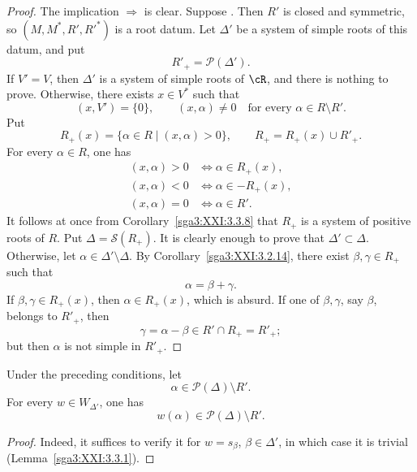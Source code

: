 \begin{proof}
The implication  \(\Rightarrow\)  is clear. Suppose .
Then \(R'\) is closed and symmetric, so
\((M,M^\ast,R',R'^\ast)\) is a root datum. Let \(\Delta'\) be a
system of simple roots of this datum, and put
\[
 R'_+=\mathscr{P}(\Delta').
\]
If \(V'=V\), then \(\Delta'\) is a system of simple roots of
\(\cR\), and there is nothing to prove. Otherwise, there exists
\(x\in V^\ast\) such that
\[
 (x,V')=\{0\},
 \qquad
 (x,\alpha)\ne0
 \quad\text{for every }\alpha\in R\setminus R'.
\]
Put
\[
 R_+(x)=\{\alpha\in R\mid(x,\alpha)>0\},
 \qquad
 R_+=R_+(x)\cup R'_+.
\]
For every \(\alpha\in R\), one has
\[
\begin{aligned}
 (x,\alpha)>0 &\Longleftrightarrow \alpha\in R_+(x),\\
 (x,\alpha)<0 &\Longleftrightarrow \alpha\in-R_+(x),\\
 (x,\alpha)=0 &\Longleftrightarrow \alpha\in R'.
\end{aligned}
\]
It follows at once from Corollary~\ref{sga3:XXI:3.3.8} that \(R_+\)
is a system of positive roots of \(R\). Put
\(\Delta=\mathscr{S}(R_+)\). It is clearly enough to prove that
\(\Delta'\subset\Delta\). Otherwise, let
\(\alpha\in\Delta'\setminus\Delta\). By
Corollary~\ref{sga3:XXI:3.2.14}, there exist
\(\beta,\gamma\in R_+\) such that
\[
 \alpha=\beta+\gamma.
\]
If \(\beta,\gamma\in R_+(x)\), then \(\alpha\in R_+(x)\), which is
absurd. If one of \(\beta,\gamma\), say \(\beta\), belongs to
\(R'_+\), then
\[
 \gamma=\alpha-\beta\in R'\cap R_+=R'_+;
\]
but then \(\alpha\) is not simple in \(R'_+\).
\end{proof}

\begin{lemma}\label{sga3:XXI:3.4.9}
Under the preceding conditions, let
\[
 \alpha\in\mathscr{P}(\Delta)\setminus R'.
\]
For every \(w\in W_{\Delta'}\), one has
\[
 w(\alpha)\in\mathscr{P}(\Delta)\setminus R'.
\]
\end{lemma}

\begin{proof}
Indeed, it suffices to verify it for
\(w=s_\beta\), \(\beta\in\Delta'\), in which case it is trivial
(Lemma~\ref{sga3:XXI:3.3.1}).
\end{proof}
